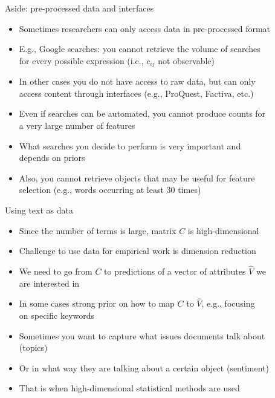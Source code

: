 \documentclass[english]{beamer}
\begin{document}
\begin{frame}{Aside: pre-processed data and interfaces}
\begin{itemize}
\setlength{\itemsep}{0.8em}
\setlength{\itemindent}{-0.7em}
\item Sometimes researchers can only access data in pre-processed format
\item E.g., Google searches: you cannot retrieve the volume of searches\\
\hspace{-7pt}for every possible expression (i.e., $c_{ij}$ not observable)
\item In other cases you do not have access to raw data, but can only\\
\hspace{-7pt}access content through interfaces (e.g., ProQuest, Factiva, etc.)
\item Even if searches can be automated, you cannot produce counts for\\
\hspace{-7pt}a very large number of features
\item What searches you decide to perform is very important and\\
\hspace{-7pt}depends on priors 
\item Also, you cannot retrieve objects that may be useful for feature\\
\hspace{-7pt}selection (e.g., words occurring at least 30 times)
\end{itemize}
\end{frame}

\begin{frame}{Using text as data}
\begin{itemize}
\setlength{\itemsep}{0.85em}
\setlength{\itemindent}{-0.6em}
\item Since the number of terms is large, matrix $C$ is high-dimensional
\item Challenge to use data for empirical work is dimension reduction
\item We need to go from $C$ to predictions of a vector of attributes $\hat{V}$ we\\
\hspace{-7pt}are interested in
\item In some cases strong prior on how to map $C$ to $\hat{V}$, e.g., focusing\\
\hspace{-7pt}on specific keywords
\item Sometimes you want to capture what issues documents talk about\\
\hspace{-7pt}(topics)
\item Or in what way they are talking about a certain object (sentiment)
\item That is when high-dimensional statistical methods are used
\end{itemize}
\end{frame}
\end{document}
